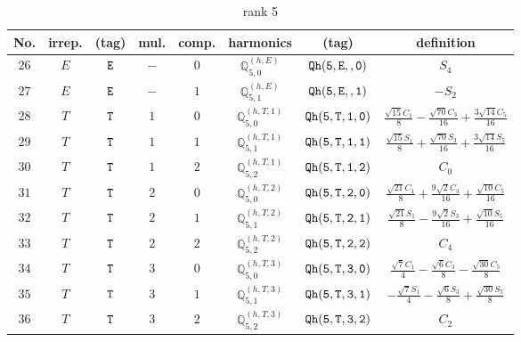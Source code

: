 \documentclass[fleqn,8pt]{jsarticle}
\begin{document}
\begin{table}[ht!]
\begin{center}
\caption{rank 5}
\renewcommand{\arraystretch}{1.3}
\begin{tabular}{cccccccc} \hline \hline
No. & irrep. & (tag) & mul. & comp. & harmonics & (tag) & definition \\ \hline
$ 26 $ & $ E $ & $ {\tt E} $ & $ - $ & $ 0 $ & $ \mathbb{Q}_{5,0}^{(h,E)} $ & $ {\tt Qh(5,E,,0)} $ & $ S_{4} $ \\
$ 27 $ & $ E $ & $ {\tt E} $ & $ - $ & $ 1 $ & $ \mathbb{Q}_{5,1}^{(h,E)} $ & $ {\tt Qh(5,E,,1)} $ & $ - S_{2} $ \\
$ 28 $ & $ T $ & $ {\tt T} $ & $ 1 $ & $ 0 $ & $ \mathbb{Q}_{5,0}^{(h,T,1)} $ & $ {\tt Qh(5,T,1,0)} $ & $ \frac{\sqrt{15} C_{1}}{8} - \frac{\sqrt{70} C_{3}}{16} + \frac{3 \sqrt{14} C_{5}}{16} $ \\
$ 29 $ & $ T $ & $ {\tt T} $ & $ 1 $ & $ 1 $ & $ \mathbb{Q}_{5,1}^{(h,T,1)} $ & $ {\tt Qh(5,T,1,1)} $ & $ \frac{\sqrt{15} S_{1}}{8} + \frac{\sqrt{70} S_{3}}{16} + \frac{3 \sqrt{14} S_{5}}{16} $ \\
$ 30 $ & $ T $ & $ {\tt T} $ & $ 1 $ & $ 2 $ & $ \mathbb{Q}_{5,2}^{(h,T,1)} $ & $ {\tt Qh(5,T,1,2)} $ & $ C_{0} $ \\
$ 31 $ & $ T $ & $ {\tt T} $ & $ 2 $ & $ 0 $ & $ \mathbb{Q}_{5,0}^{(h,T,2)} $ & $ {\tt Qh(5,T,2,0)} $ & $ \frac{\sqrt{21} C_{1}}{8} + \frac{9 \sqrt{2} C_{3}}{16} + \frac{\sqrt{10} C_{5}}{16} $ \\
$ 32 $ & $ T $ & $ {\tt T} $ & $ 2 $ & $ 1 $ & $ \mathbb{Q}_{5,1}^{(h,T,2)} $ & $ {\tt Qh(5,T,2,1)} $ & $ \frac{\sqrt{21} S_{1}}{8} - \frac{9 \sqrt{2} S_{3}}{16} + \frac{\sqrt{10} S_{5}}{16} $ \\
$ 33 $ & $ T $ & $ {\tt T} $ & $ 2 $ & $ 2 $ & $ \mathbb{Q}_{5,2}^{(h,T,2)} $ & $ {\tt Qh(5,T,2,2)} $ & $ C_{4} $ \\
$ 34 $ & $ T $ & $ {\tt T} $ & $ 3 $ & $ 0 $ & $ \mathbb{Q}_{5,0}^{(h,T,3)} $ & $ {\tt Qh(5,T,3,0)} $ & $ \frac{\sqrt{7} C_{1}}{4} - \frac{\sqrt{6} C_{3}}{8} - \frac{\sqrt{30} C_{5}}{8} $ \\
$ 35 $ & $ T $ & $ {\tt T} $ & $ 3 $ & $ 1 $ & $ \mathbb{Q}_{5,1}^{(h,T,3)} $ & $ {\tt Qh(5,T,3,1)} $ & $ - \frac{\sqrt{7} S_{1}}{4} - \frac{\sqrt{6} S_{3}}{8} + \frac{\sqrt{30} S_{5}}{8} $ \\
$ 36 $ & $ T $ & $ {\tt T} $ & $ 3 $ & $ 2 $ & $ \mathbb{Q}_{5,2}^{(h,T,3)} $ & $ {\tt Qh(5,T,3,2)} $ & $ C_{2} $ \\
 \hline \hline
\end{tabular}
\end{center}
\end{table}
\end{document}
